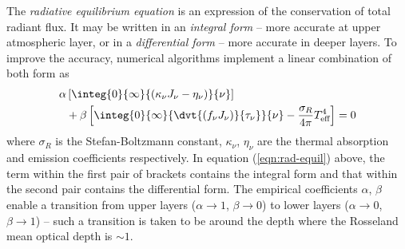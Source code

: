 		The \textit{radiative equilibrium equation} is an expression of the conservation of total radiant flux. It may be written in an \textit{integral form} -- more accurate at upper atmospheric layer, or in a \textit{differential form} -- more accurate in deeper layers. To improve the accuracy, numerical algorithms implement a linear combination of both form as
		\begin{align}
			\alpha&\left[ \integ{0}{\infty}{(\kappa_\nu J_\nu-\eta_\nu)}{\nu} \right] \nonumber\\
				&+\beta\left[ \integ{0}{\infty}{\dvt{(f_\nu J_\nu)}{\tau_\nu}}{\nu}-\dfrac{\sigma_R}{4\pi}T_\text{eff}^4 \right]=0 \label{eqn:rad-equil}
		\end{align}
		where $\sigma_R$ is the Stefan-Boltzmann constant, $\kappa_\nu$, $\eta_\nu$ are the thermal absorption and emission coefficients respectively. In equation (\ref{eqn:rad-equil}) above, the term within the first pair of brackets contains the integral form and that within the second pair contains the differential form. The empirical coefficients $\alpha$, $\beta$ enable a transition from upper layers ($\alpha\rightarrow 1$, $\beta\rightarrow 0$) to lower layers ($\alpha\rightarrow 0$, $\beta\rightarrow 1$) -- such a transition is taken to be around the depth where the Rosseland mean optical depth is $\sim 1$.
		
